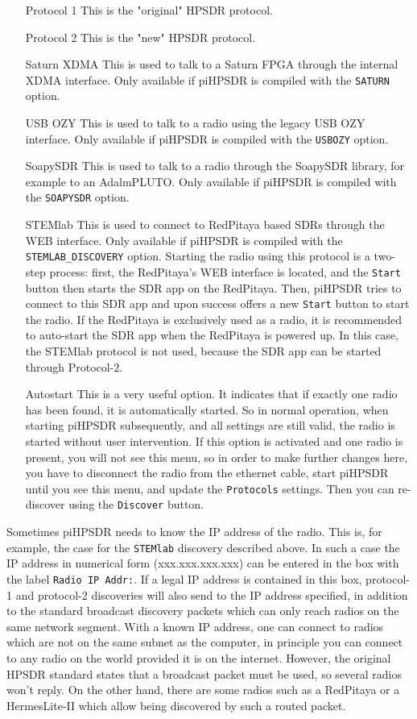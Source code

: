 \documentclass[12pt]{book}
\def\rett#1{\texttt{\color{red}#1}}
\begin{document}
\begin{itemize}[font=\texttt, left=80pt]
\item[Protocol 1]{This is the "original" HPSDR protocol.}
\item[Protocol 2]{This is the "new" HPSDR protocol.}
\item[Saturn XDMA]{This is used to talk to a Saturn FPGA through the internal XDMA interface. Only available
if piHPSDR is compiled with the \texttt{SATURN}  option.}
\item[USB OZY]{This is used to talk to a radio using the legacy USB OZY interface. Only available if piHPSDR
is compiled with the \texttt{USBOZY} option.}
\item[SoapySDR]{This is used to talk to a radio through the SoapySDR library, for example to an AdalmPLUTO.
Only available if piHPSDR is compiled with the \texttt{SOAPYSDR} option.}
\item[STEMlab]{This is used to connect to RedPitaya based SDRs through the WEB interface. Only available if
piHPSDR is compiled with the \texttt{STEMLAB\_DISCOVERY} option. Starting the radio using this protocol is a
two-step process:
first, the RedPitaya's WEB interface is located, and the \texttt{Start} button then starts the SDR app
on the RedPitaya. Then, piHPSDR tries to connect to this SDR app and upon success offers a new
\texttt{Start} button to start the radio. If the RedPitaya is exclusively used as a radio, it is recommended
to auto-start the SDR app
when the RedPitaya is powered up. In this case, the STEMlab protocol is not used, because the SDR app can be started through Protocol-2.}
\item[Autostart]{This is a very useful option. It indicates that if exactly one radio has been found, it is
automatically started. So in normal operation, when starting piHPSDR subsequently, and all settings are
still valid, the radio is started without user intervention. If this option is activated and one radio is
present, you will not see this menu, so in order to make further changes here, you have to disconnect the
radio from the ethernet cable, start piHPSDR until you see this menu, and update the \rett{Protocols}
settings. Then you can re-discover using the \rett{Discover} button.}
\end{itemize}

Sometimes piHPSDR needs to know the IP address of the radio. This is, for example, the case for the
\texttt{STEMlab} discovery
described above. In such a case the IP address in numerical form (xxx.xxx.xxx.xxx) can be entered in the box
with the label \rett{Radio IP Addr:}. If a legal IP address is contained in this box, protocol-1 and
protocol-2 discoveries
will also send to the IP address specified, in addition to the standard broadcast discovery packets which
can only reach
radios on the same network segment. With a known IP address,  one can
connect to radios which are not on the same subnet as the computer, in principle you can connect to any
radio on the world
provided it is on the internet. However, the original HPSDR standard states that a broadcast packet must be
used, so several
radios won't reply. On the other hand, there are some radios such as a RedPitaya or a HermesLite-II which
allow being discovered by such a routed packet.
\end{document}
